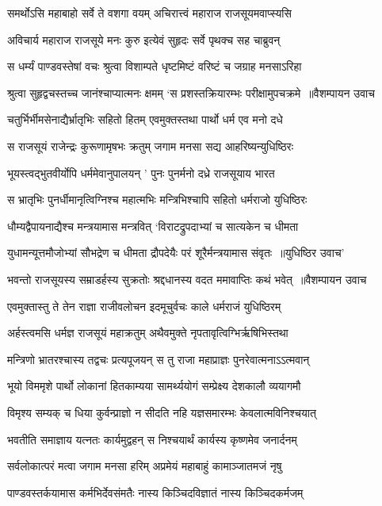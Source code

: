 \twolineshloka
{समर्थोऽसि महाबाहो सर्वे ते वशगा वयम्}
{अचिरात्त्वं महाराज राजसूयमवाप्स्यसि}


\twolineshloka
{अविचार्य महाराज राजसूये मनः कुरु}
{इत्येवं सुहृदः सर्वे पृथक्च सह चाब्रुवन्}


\twolineshloka
{स धर्म्यं पाण्डवस्तेषां वचः श्रुत्वा विशाम्पते}
{धृष्टमिष्टं वरिष्टं च जग्राह मनसाऽरिहा}


\twolineshloka
{श्रुत्वा सुहृद्वचस्तच्च जानंश्चाप्यात्मनः क्षमम्}
{`स प्रशस्तक्रियारम्भः परीक्षामुपचक्रमे ॥वैशम्पायन उवाच}


\twolineshloka
{चतुर्भिर्भीमसेनाद्यैर्भ्रातृभिः सहितो हितम्}
{एवमुक्तस्तथा पार्थो धर्म एव मनो दधे}


\twolineshloka
{स राजसूयं राजेन्द्रः कुरूणामृषभः क्रतुम्}
{जगाम मनसा सद्य आहरिष्यन्युधिष्ठिरः}


\twolineshloka
{भूयस्त्वद्भुतवीर्योपि धर्ममेवानुपालयन् '}
{पुनः पुनर्मनो दध्रे राजसूयाय भारत}


\twolineshloka
{स भ्रातृभिः पुनर्धीमानृत्विग्निश्च महात्मभिः}
{मन्त्रिभिश्चापि सहितो धर्मराजो युधिष्ठिरः}


\twolineshloka
{धौम्यद्वैपायनाद्यैश्च मन्त्रयामास मन्त्रवित्}
{`विराटद्रुपदाभ्यां च सात्यकेन च धीमता}


\twolineshloka
{युधामन्यूत्तमौजोभ्यां सौभद्रेण च धीमता}
{द्रौपदेयैः परं शूरैर्मन्त्रयामास संवृतः ॥युधिष्ठिर उवाच'}


\threelineshloka
{भवन्तो राजसूयस्य सम्राडर्हस्य सुक्रतोः}
{श्रद्दधानस्य वदत ममावाप्तिः कथं भवेत् ॥वैशम्पायन उवाच}
{}


\twolineshloka
{एवमुक्तास्तु ते तेन राज्ञा राजीवलोचन}
{इदमूचुर्वचः काले धर्मराजं युधिष्ठिरम्}


\twolineshloka
{अर्हस्त्वमसि धर्मज्ञ राजसूयं महाक्रतुम्}
{अथैवमुक्ते नृपतावृत्विग्भिर्ऋषिभिस्तथा}


\twolineshloka
{मन्त्रिणो भ्रातरश्चास्य तद्वचः प्रत्यपूजयन्}
{स तु राजा महाप्राज्ञः पुनरेवात्मनाऽऽत्मवान्}


\twolineshloka
{भूयो विममृशे पार्थो लोकानां हितकाम्यया}
{सामर्थ्ययोगं सम्प्रेक्ष्य देशकालौ व्ययागमौ}


\twolineshloka
{विमृश्य सम्यक् च धिया कुर्वन्प्राज्ञो न सीदति}
{नहि यज्ञसमारम्भः केवलात्मविनिश्चयात्}


\twolineshloka
{भवतीति समाज्ञाय यत्नतः कार्यमुद्वहन्}
{स निश्चयार्थं कार्यस्य कृष्णमेव जनार्दनम्}


\twolineshloka
{सर्वलोकात्परं मत्वा जगाम मनसा हरिम्}
{अप्रमेयं महाबाहुं कामाञ्जातमजं नृषु}


\twolineshloka
{पाण्डवस्तर्कयामास कर्मभिर्देवसंमतैः}
{नास्य किञ्चिदविज्ञातं नास्य किञ्चिदकर्मजम्}


